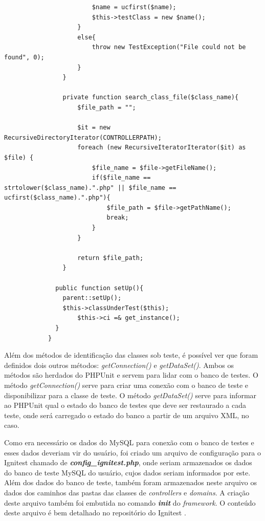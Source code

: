 \begin{lstlisting}
                        $name = ucfirst($name);
                        $this->testClass = new $name();
                    }
                    else{
                        throw new TestException("File could not be found", 0);
                    }
                }

                private function search_class_file($class_name){
                    $file_path = "";

                    $it = new RecursiveDirectoryIterator(CONTROLLERPATH);
                    foreach (new RecursiveIteratorIterator($it) as $file) {
                        $file_name = $file->getFileName();
                        if($file_name == strtolower($class_name).".php" || $file_name == ucfirst($class_name).".php"){
                            $file_path = $file->getPathName();
                            break; 
                        }
                    }

                    return $file_path;
                }

              public function setUp(){
                parent::setUp();
                $this->classUnderTest($this);
                    $this->ci =& get_instance();
              }
            }
    \end{lstlisting}
    
    Além dos métodos de identificação das classes sob teste, é possível ver que foram definidos dois outros métodos:
    \textit{getConnection()} e \textit{getDataSet()}. Ambos os métodos são herdados do PHPUnit e servem para lidar com 
    o banco de testes. O método \textit{getConnection()} serve para criar uma conexão com o banco de teste e disponibilizar
    para a classe de teste. O método \textit{getDataSet()} serve para informar ao PHPUnit qual o estado do banco de testes
    que deve ser restaurado a cada teste, onde será carregado o estado do banco a partir de um arquivo XML, no caso.
    
    Como era necessário os dados do MySQL para conexão com o banco de testes e esses dados deveriam vir do usuário, foi criado
    um arquivo de configuração para o Ignitest chamado de \textit{\textbf{config\_ignitest.php}}, onde seriam armazenados os dados
    do banco de teste MySQL do usuário, cujos dados seriam informados por este. Além dos dados do banco de teste, também foram 
    armazenados neste arquivo os dados dos caminhos das pastas das classes de \textit{controllers} e \textit{domains}. 
    A criação deste arquivo também foi embutida no comando \textit{\textbf{init}} do \textit{framework}.
    O conteúdo deste arquivo é bem detalhado no repositório do Ignitest \footnotemark.
    
